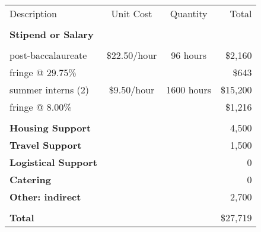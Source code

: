 \begin{center}
\begin{tabular}{lccr}
Description & Unit Cost & Quantity & Total \\
\\
{\bf Stipend or Salary}\\
\vspace{-0.5em}\\
post-baccalaureate  & \$22.50/hour & 96 hours & \$2,160 \\
fringe  @ 29.75\% & & & \$643 \\
summer interns (2) &  \$9.50/hour  & 1600 hours & \$15,200 \\
fringe  @ 8.00\% & & & \$1,216 \\
\vspace{-0.5em}\\
{\bf Housing Support}&  & & 4,500 \\
{\bf Travel Support}&  & & 1,500 \\
{\bf Logistical Support} &  & & 0 \\
{\bf Catering} &  & & 0 \\
{\bf Other: indirect} &  & & 2,700 \\
\vspace{-0.5em}\\
{\bf Total} & & & \$27,719\\
\end{tabular}
\end{center}

